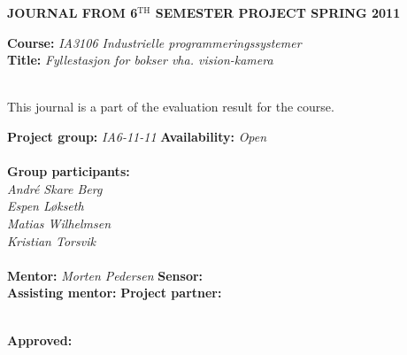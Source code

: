 \documentclass [12pt,norsk]{article}
\newcommand{\Gruppe}{IA6-11-11}
\newcommand{\Emne}{Industrielle programmeringssystemer}
\newcommand{\Emnekode}{IA3106}
\newcommand{\Tittel}{Fyllestasjon for bokser vha. vision-kamera}
\newcommand{\Hovedveileder}{Morten Pedersen}
\newcommand{\Biveileder}{}
\newcommand{\Sensor}{}
\newcommand{\Prosjektpartner}{}
\begin{document}
\label{Summary}

\textbf{\MakeUppercase{Journal from 6$^\text{TH}$ semester project spring 2011}}  \\
\begin{tabbing}
    \textbf{Course: }   \= \textit{\Emnekode { } \Emne }\\
    \textbf{Title: }    \> \textit{\Tittel}
\end{tabbing}
\noindent\\
This journal is a part of the evaluation result for the course.
\noindent\\
\begin{tabbing}
    \noindent \textbf{Project group: \hspace{6mm}} \= \textit{\Gruppe }\hspace{35mm}   \=
    \textbf{Availability: \hspace{9mm}}            \= \textit{Open}            \\
    \noindent                   \\
    \textbf{Group participants:}\\
    \textit{André Skare Berg}   \\
    \textit{Espen Løkseth}      \\
    \textit{Matias Wilhelmsen}  \\
    \textit{Kristian Torsvik}   \\
    \noindent                   \\
    \textbf{Mentor:}            \> \textit{\Hovedveileder} \> \textbf{Sensor:}          \> \textit{\Sensor} \\
    \textbf{Assisting mentor: } \> \textit{\Biveileder}    \> \textbf{Project partner:} \> \textit{\Prosjektpartner}
\end{tabbing}

\noindent\\
\textbf{Approved: }\hrulefill \\
\end{document}
